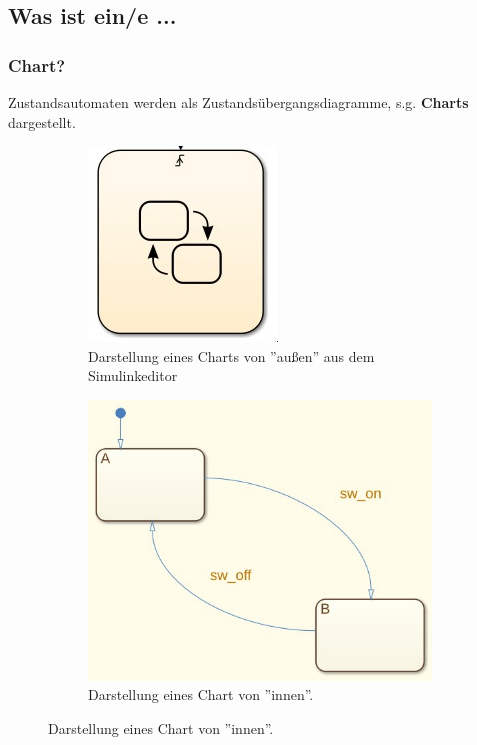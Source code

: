 \documentclass{article}
\begin{document}
\begin{multicols}{2}
		\subsection{Was ist ein/e ...}
			\subsubsection{Chart?}
				Zustandsautomaten werden als Zustandsübergangsdiagramme, s.g. \textbf{Charts} dargestellt. 
		\end{multicols}
			\begin{figure}[hb]
				\begin{subfigure}{0.5 \textwidth}
					\includegraphics[scale=0.8]{Chart_extern.png}
					\caption{Darstellung eines Charts von ''außen'' aus dem Simulinkeditor}
					\label{fig_1:Chart extern}
				\end{subfigure}
				\begin{subfigure}{0.5 \textwidth}
					\includegraphics[scale=0.4]{Chart_intern.png}
					\caption{Darstellung eines Chart von ''innen''.}
					\label{fig_2: Chart intern}
				\end{subfigure}
			\end{figure}
\end{document}
